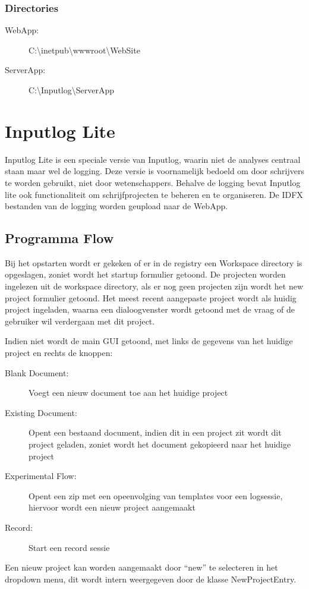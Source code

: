 \documentclass[a4paper,11pt]{report}
\begin{document}
\subsection{Directories}
\begin{description}
\item[WebApp:] C:\textbackslash inetpub\textbackslash  wwwroot\textbackslash  WebSite
\item[ServerApp:] C:\textbackslash  Inputlog\textbackslash  ServerApp
\end{description}
	
\chapter{Inputlog Lite}
Inputlog Lite is een speciale versie van Inputlog, waarin niet de analyses centraal staan maar wel de logging. Deze versie is voornamelijk bedoeld om door schrijvers te worden gebruikt, niet door wetenschappers. Behalve de logging bevat Inputlog lite ook functionaliteit om schrijfprojecten te beheren en te organiseren. De IDFX bestanden van de logging worden geupload naar de WebApp.

\section{Programma Flow}
Bij het opstarten wordt er gekeken of er in de registry een Workspace directory is opgeslagen, zoniet wordt het startup formulier getoond. De projecten worden ingelezen uit de workspace directory, als er nog geen projecten zijn wordt het new project formulier getoond. Het meest recent aangepaste project wordt als huidig project ingeladen, waarna een dialoogvenster wordt getoond met de vraag of de gebruiker wil verdergaan met dit project.

Indien niet wordt de main GUI getoond, met links de gegevens van het huidige project en rechts de knoppen:
\begin{description}
\item[Blank Document:] Voegt een nieuw document toe aan het huidige project
\item[Existing Document:] Opent een bestaand document, indien dit in een project zit wordt dit project geladen, zoniet wordt het document gekopieerd naar het huidige project
\item[Experimental Flow:] Opent een zip met een opeenvolging van templates voor een logsessie, hiervoor wordt een nieuw project aangemaakt
\item[Record:] Start een record sessie
\end{description}
Een nieuw project kan worden aangemaakt door ``new'' te selecteren in het dropdown menu, dit wordt intern weergegeven door de klasse NewProjectEntry.
\end{document}
